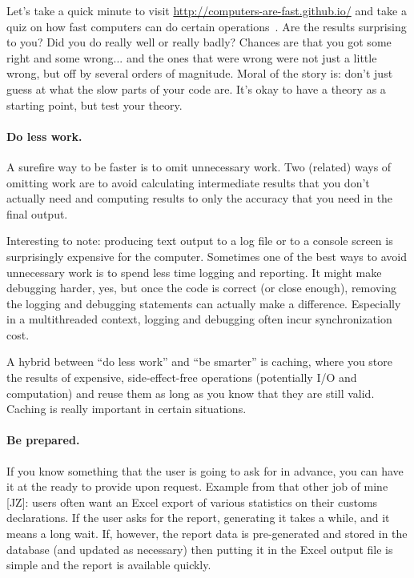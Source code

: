 Let's take a quick minute to visit \url{http://computers-are-fast.github.io/} and take a quiz on how fast computers can do certain operations~\cite{cafgithub}. Are the results surprising to you? Did you do really well or really badly? Chances are that you got some right and some wrong... and the ones that were wrong were not just a little wrong, but off by several orders of magnitude. Moral of the story is: don't just guess at what the slow parts of your code are. It's okay to have a theory as a starting point, but test your theory.


\paragraph{Do less work.} A surefire way to be faster is to omit unnecessary
work. Two (related) ways of omitting work are to avoid calculating
intermediate results that you don't actually need and computing
results to only the accuracy that you need in the final output.

Interesting to note: producing text output to a log file or to a console screen is surprisingly expensive for the computer. Sometimes one of the best ways to avoid unnecessary work is to spend less time logging and reporting. It might make debugging harder, yes, but once the code is correct (or close enough), removing the logging and debugging statements can actually make a difference. Especially in a multithreaded context, logging and debugging often incur synchronization cost.

A hybrid between ``do less work'' and ``be smarter'' is caching, where
you store the results of expensive, side-effect-free operations
(potentially I/O and computation) and reuse them as long as you
know that they are still valid. Caching is really important in certain situations.

\paragraph{Be prepared.} If you know something that the user is going to ask for in advance, you can have it at the ready to provide upon request. Example from that other job of mine [JZ]: users often want an Excel export of various statistics on their customs declarations. If the user asks for the report, generating it takes a while, and it means a long wait. If, however, the report data is pre-generated and stored in the database (and updated as necessary) then putting it in the Excel output file is simple and the report is available quickly.

